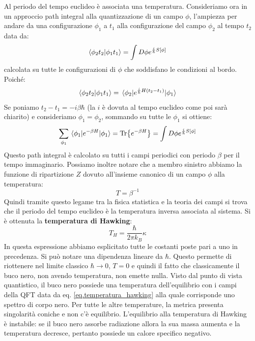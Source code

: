 Al periodo del tempo euclideo è associata una temperatura.
Consideriamo ora in un approccio path integral alla quantizzazione di un campo $\phi$, l'ampiezza per andare da una configurazione $\phi_1$ a $t_1$ alla configurazione del campo $\phi_2$ al tempo $t_2$ data da:
\begin{equation}
    \braket{\phi_2 t_2}{\phi_1 t_1} = \int D\phi e^{\frac{i}{\hbar}S[\phi]}
    \label{eq.path_integral}
\end{equation}
calcolata su tutte le configurazioni di $\phi$ che soddisfano le condizioni al bordo. Poiché:
\begin{equation*}
    \braket{\phi_2 t_2}{\phi_1 t_1} = \mel{\phi_2}{e^{\frac{i}{\hbar} H(t_2-t_1)}}{\phi_1} 
\end{equation*}
Se poniamo $t_2 - t_1 = -i\beta\hbar$ (la $i$ è dovuta al tempo euclideo come poi sarà chiarito) e consideriamo $\phi_1 = \phi_2$, sommando su tutte le $\phi_1$ si ottiene:
\begin{equation*}
    \sum_{\phi_1} \mel{\phi_1}{e^{-\beta H}}{\phi_1} = \Tr{e^{-\beta H}} = \int D\phi e^{\frac{i}{\hbar}S[\phi]}
\end{equation*}
Questo path integral è calcolato su tutti i campi periodici con periodo $\beta$ per il tempo immaginario. Possiamo inoltre notare che a membro sinistro abbiamo la funzione di ripartizione $Z$ dovuto all'insieme canonico di un campo $\phi$ alla temperatura:
\begin{equation*}
    T = \beta^{-1}
\end{equation*}
Quindi tramite questo legame tra la fisica statistica e la teoria dei campi si trova che il periodo del tempo euclideo è la temperatura inversa associata al sistema. Si è ottenuta la \textbf{temperatura di Hawking}:
\begin{equation}
    T_H = \frac{\hbar}{2\pi k_B}\kappa
    \label{eq.temperatura_hawking}
\end{equation}
In questa espressione abbiamo esplicitato tutte le costanti poste pari a uno in precedenza. Si può notare una dipendenza lineare da $\hbar$. Questo permette di riottenere nel limite classico $\hbar \rightarrow 0$, $T = 0$ e quindi il fatto che classicamente il buco nero, non avendo temperatura, non emette nulla. Visto dal punto di vista quantistico, il buco nero possiede una temperatura dell'equilibrio con i campi della QFT data da eq. \ref{eq.temperatura_hawking} alla quale corrisponde uno spettro di corpo nero. Per tutte le altre temperature, la metrica presenta singolarità coniche e non c'è equilibrio. 
L'equilibrio alla temperatura di Hawking è instabile: se il buco nero assorbe radiazione allora la sua massa aumenta e la temperatura decresce, pertanto possiede un calore specifico negativo.

